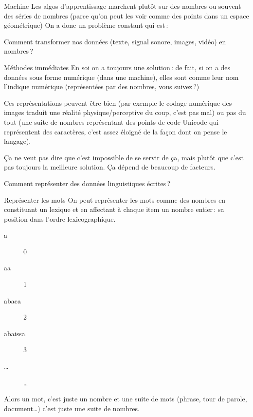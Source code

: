 \documentclass[
	xcolor={svgnames},
	aspectratio=169,
	french,
]{beamer}
\begin{document}


\begin{frame}{Machine}
	Les algos d'apprentissage marchent plutôt sur des nombres ou souvent des séries de nombres
	(parce qu'on peut les voir comme des points dans un espace géométrique)  On a donc un problème
	constant qui est : 

	Comment transformer nos données (texte, signal sonore, images, vidéo) en nombres ?
\end{frame}

\begin{frame}{Méthodes immédiates}
	En soi on a toujours une solution : \pause de fait, si on a des données sous forme numérique (dans une
	machine), elles sont comme leur nom l'indique numérique (représentées par des nombres, vous
	suivez ?)

	Ces représentations peuvent être bien (par exemple le codage numérique des images traduit une
	réalité physique/perceptive du coup, c'est pas mal) ou pas du tout (une suite de nombres
	représentant des points de code Unicode qui représentent des caractères, c'est assez éloigné de la
	façon dont on pense le langage).

	\pause

	Ça ne veut pas dire que c'est impossible de se servir de ça, mais plutôt que c'est pas toujours
	la meilleure solution. Ça dépend de beaucoup de facteurs.
\end{frame}

\begin{frame}[standout]
	Comment représenter des données linguistiques écrites ?
\end{frame}

\begin{frame}{Représenter les mots}
	On peut représenter les mots comme des nombres en constituant un \alert{lexique} et en affectant
	à chaque item un nombre entier : sa position dans l'ordre lexicographique.

	\pause

	\begin{description}
		\item[a] \num{0}
		\item[aa] \num{1}
		\item[abaca] \num{2}
		\item[abaissa] \num{3}
		\item[…] … 
	\end{description}

	\pause

	Alors un mot, c'est juste un nombre et une suite de mots (phrase, tour de parole, document…)
	c'est juste une suite de nombres.
\end{frame}
\end{document}
